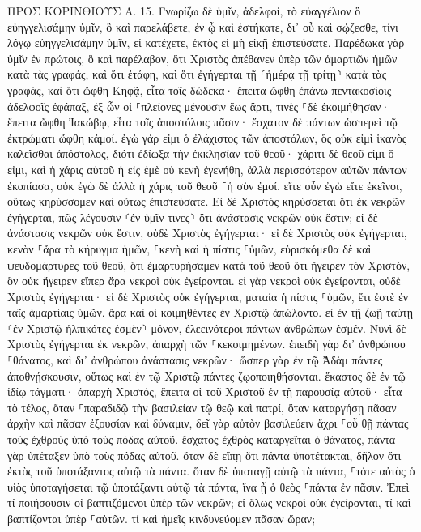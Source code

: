 \documentclass[twoside, 9pt]{extreport}
\begin{document}
ΠΡΟΣ ΚΟΡΙΝΘΙΟΥΣ Α.
15.
Γνωρίζω δὲ ὑμῖν, ἀδελφοί, τὸ εὐαγγέλιον ὃ εὐηγγελισάμην ὑμῖν, ὃ καὶ παρελάβετε, ἐν ᾧ καὶ ἑστήκατε, 
δι᾽ οὗ καὶ σῴζεσθε, τίνι λόγῳ εὐηγγελισάμην ὑμῖν, εἰ κατέχετε, ἐκτὸς εἰ μὴ εἰκῇ ἐπιστεύσατε. 
Παρέδωκα γὰρ ὑμῖν ἐν πρώτοις, ὃ καὶ παρέλαβον, ὅτι Χριστὸς ἀπέθανεν ὑπὲρ τῶν ἁμαρτιῶν ἡμῶν κατὰ τὰς γραφάς, 
καὶ ὅτι ἐτάφη, καὶ ὅτι ἐγήγερται τῇ ⸂ἡμέρᾳ τῇ τρίτῃ⸃ κατὰ τὰς γραφάς, 
καὶ ὅτι ὤφθη Κηφᾷ, εἶτα τοῖς δώδεκα· 
ἔπειτα ὤφθη ἐπάνω πεντακοσίοις ἀδελφοῖς ἐφάπαξ, ἐξ ὧν οἱ ⸀πλείονες μένουσιν ἕως ἄρτι, τινὲς ⸀δὲ ἐκοιμήθησαν· 
ἔπειτα ὤφθη Ἰακώβῳ, εἶτα τοῖς ἀποστόλοις πᾶσιν· 
ἔσχατον δὲ πάντων ὡσπερεὶ τῷ ἐκτρώματι ὤφθη κἀμοί. 
ἐγὼ γάρ εἰμι ὁ ἐλάχιστος τῶν ἀποστόλων, ὃς οὐκ εἰμὶ ἱκανὸς καλεῖσθαι ἀπόστολος, διότι ἐδίωξα τὴν ἐκκλησίαν τοῦ θεοῦ· 
χάριτι δὲ θεοῦ εἰμι ὅ εἰμι, καὶ ἡ χάρις αὐτοῦ ἡ εἰς ἐμὲ οὐ κενὴ ἐγενήθη, ἀλλὰ περισσότερον αὐτῶν πάντων ἐκοπίασα, οὐκ ἐγὼ δὲ ἀλλὰ ἡ χάρις τοῦ θεοῦ ⸀ἡ σὺν ἐμοί. 
εἴτε οὖν ἐγὼ εἴτε ἐκεῖνοι, οὕτως κηρύσσομεν καὶ οὕτως ἐπιστεύσατε. 
Εἰ δὲ Χριστὸς κηρύσσεται ὅτι ἐκ νεκρῶν ἐγήγερται, πῶς λέγουσιν ⸂ἐν ὑμῖν τινες⸃ ὅτι ἀνάστασις νεκρῶν οὐκ ἔστιν; 
εἰ δὲ ἀνάστασις νεκρῶν οὐκ ἔστιν, οὐδὲ Χριστὸς ἐγήγερται· 
εἰ δὲ Χριστὸς οὐκ ἐγήγερται, κενὸν ⸀ἄρα τὸ κήρυγμα ἡμῶν, ⸀κενὴ καὶ ἡ πίστις ⸀ὑμῶν, 
εὑρισκόμεθα δὲ καὶ ψευδομάρτυρες τοῦ θεοῦ, ὅτι ἐμαρτυρήσαμεν κατὰ τοῦ θεοῦ ὅτι ἤγειρεν τὸν Χριστόν, ὃν οὐκ ἤγειρεν εἴπερ ἄρα νεκροὶ οὐκ ἐγείρονται. 
εἰ γὰρ νεκροὶ οὐκ ἐγείρονται, οὐδὲ Χριστὸς ἐγήγερται· 
εἰ δὲ Χριστὸς οὐκ ἐγήγερται, ματαία ἡ πίστις ⸀ὑμῶν, ἔτι ἐστὲ ἐν ταῖς ἁμαρτίαις ὑμῶν. 
ἄρα καὶ οἱ κοιμηθέντες ἐν Χριστῷ ἀπώλοντο. 
εἰ ἐν τῇ ζωῇ ταύτῃ ⸂ἐν Χριστῷ ἠλπικότες ἐσμὲν⸃ μόνον, ἐλεεινότεροι πάντων ἀνθρώπων ἐσμέν. 
Νυνὶ δὲ Χριστὸς ἐγήγερται ἐκ νεκρῶν, ἀπαρχὴ τῶν ⸀κεκοιμημένων. 
ἐπειδὴ γὰρ δι᾽ ἀνθρώπου ⸀θάνατος, καὶ δι᾽ ἀνθρώπου ἀνάστασις νεκρῶν· 
ὥσπερ γὰρ ἐν τῷ Ἀδὰμ πάντες ἀποθνῄσκουσιν, οὕτως καὶ ἐν τῷ Χριστῷ πάντες ζῳοποιηθήσονται. 
ἕκαστος δὲ ἐν τῷ ἰδίῳ τάγματι· ἀπαρχὴ Χριστός, ἔπειτα οἱ τοῦ Χριστοῦ ἐν τῇ παρουσίᾳ αὐτοῦ· 
εἶτα τὸ τέλος, ὅταν ⸀παραδιδῷ τὴν βασιλείαν τῷ θεῷ καὶ πατρί, ὅταν καταργήσῃ πᾶσαν ἀρχὴν καὶ πᾶσαν ἐξουσίαν καὶ δύναμιν, 
δεῖ γὰρ αὐτὸν βασιλεύειν ἄχρι ⸀οὗ θῇ πάντας τοὺς ἐχθροὺς ὑπὸ τοὺς πόδας αὐτοῦ. 
ἔσχατος ἐχθρὸς καταργεῖται ὁ θάνατος, 
πάντα γὰρ ὑπέταξεν ὑπὸ τοὺς πόδας αὐτοῦ. ὅταν δὲ εἴπῃ ὅτι πάντα ὑποτέτακται, δῆλον ὅτι ἐκτὸς τοῦ ὑποτάξαντος αὐτῷ τὰ πάντα. 
ὅταν δὲ ὑποταγῇ αὐτῷ τὰ πάντα, ⸀τότε αὐτὸς ὁ υἱὸς ὑποταγήσεται τῷ ὑποτάξαντι αὐτῷ τὰ πάντα, ἵνα ᾖ ὁ θεὸς ⸀πάντα ἐν πᾶσιν. 
Ἐπεὶ τί ποιήσουσιν οἱ βαπτιζόμενοι ὑπὲρ τῶν νεκρῶν; εἰ ὅλως νεκροὶ οὐκ ἐγείρονται, τί καὶ βαπτίζονται ὑπὲρ ⸀αὐτῶν. 
τί καὶ ἡμεῖς κινδυνεύομεν πᾶσαν ὥραν; 
\end{document}

